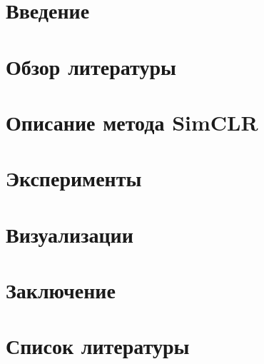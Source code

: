 \documentclass[a4paper,14pt]{extarticle}
\begin{document}


\addtocounter{page}{1}
\newpage
\tableofcontents

\newpage


\newpage
\section{Введение}


\section{Обзор литературы}


\section{Описание метода SimCLR}
\label{simclr:1}


\section{Эксперименты}


\section{Визуализации}


\section{Заключение}


\newpage
\section*{Список литературы} 
\printbibliography[heading=none]

\newpage

\end{document}
